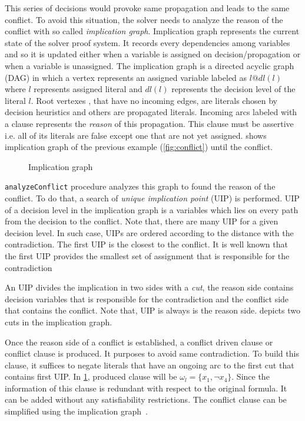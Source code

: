 This series of decisions would provoke same propagation and leads to the same conflict. To avoid this
situation, the solver needs to analyze the reason of the conflict with so called \emph{implication graph}.
Implication graph represents the current state of the solver proof system. It records every dependencies
among variables and so it is updated either when a variable is assigned on decision/propagation or  when a variable
is unassigned. The implication graph is a directed acyclic graph (DAG) in which a vertex represents an assigned variable labeled as $l@dl(l)$ where $l$ represents assigned literal and $dl(l)$ represents the decision level of the literal $l$.
Root vertexes , that have no incoming edges, are literals chosen by decision heuristics and others are 
propagated literals.
Incoming arcs labeled with a clause represents the \emph{reason} of this propagation.
This clause must be assertive i.e. all of its literals are false except one that are not yet assigned.
 shows implication graph of the previous example (\cref{fig:conflict}) until the conflict.

\begin{figure}[!htbp]
	\centering
	
	\caption{Implication graph}
	\label{fig:implication-graph}
\end{figure}


\texttt{analyzeConflict} procedure analyzes this graph to found the reason of the conflict. To do that, a search of
\emph{unique implication point} (UIP) is performed. UIP of a decision level in the implication graph is a variables
which lies on every path from the decision to the conflict. Note that, there are many UIP for a given decision level.
In such case, UIPs are ordered according to the distance with the contradiction. The first UIP is the closest to
the conflict. It is well known that the first UIP provides the smallest set of assignment that is responsible for the
contradiction~\cite{zhang2001efficient}

An UIP divides the implication in two sides with a \emph{cut}, the reason side contains decision variables 
that is responsible for the contradiction and the conflict side that contains the conflict. Note that, UIP is always is the 
reason side.  depicts two cuts in the implication graph.

Once the reason side of a conflict is established, a conflict driven clause or conflict clause is produced.
It purposes to avoid same contradiction. To build this clause, it suffices to negate 
literals that have an ongoing arc to the first cut that contains first UIP. In \cref{fig:implication-graph}, produced
clause will be $\omega_l = \{x_1, \neg x_4 \}$. Since the information of this clause is redundant with respect to 
the original formula. It can be added without any satisfiability restrictions. The conflict clause can be simplified
using the implication graph~\cite{sorensson2009minimizing}.

